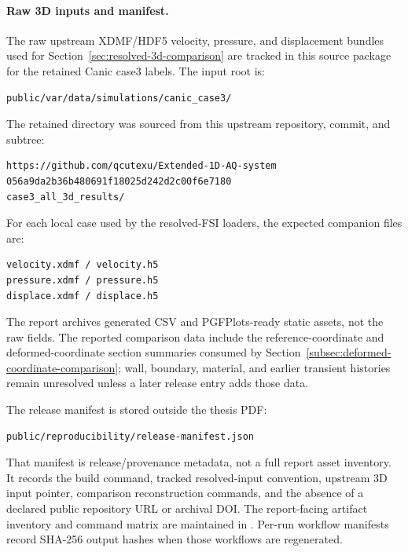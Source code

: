 \paragraph*{Raw 3D inputs and manifest.}
The raw upstream XDMF/HDF5 velocity, pressure, and displacement bundles used for
Section~\ref{sec:resolved-3d-comparison} are tracked in this source package for
the retained Canic case3 labels. The input root is:
\begin{lstlisting}[basicstyle=\ttfamily\footnotesize,breaklines=true]
public/var/data/simulations/canic_case3/
\end{lstlisting}
The retained directory was sourced from this upstream repository, commit, and
subtree:
\begin{lstlisting}[basicstyle=\ttfamily\footnotesize,breaklines=true]
https://github.com/qcutexu/Extended-1D-AQ-system
056a9da2b36b480691f18025d242d2c00f6e7180
case3_all_3d_results/
\end{lstlisting}
For each local case used by the resolved-FSI loaders, the expected companion
files are:
\begin{lstlisting}[basicstyle=\ttfamily\footnotesize,breaklines=true]
velocity.xdmf / velocity.h5
pressure.xdmf / pressure.h5
displace.xdmf / displace.h5
\end{lstlisting}
The report archives generated CSV and PGFPlots-ready static assets, not the raw
fields. The reported comparison data
include the reference-coordinate and deformed-coordinate section summaries
consumed by Section~\ref{subsec:deformed-coordinate-comparison}; wall,
boundary, material, and earlier transient histories remain unresolved unless a
later release entry adds those data.

The release manifest is stored outside the thesis PDF:
\begin{lstlisting}[basicstyle=\ttfamily\footnotesize,breaklines=true]
public/reproducibility/release-manifest.json
\end{lstlisting}
That manifest is release/provenance metadata, not a full report asset
inventory. It records the build command, tracked resolved-input convention,
upstream 3D input pointer, comparison reconstruction commands, and the absence
of a declared public repository URL or archival DOI. The report-facing artifact
inventory and command matrix are maintained in
.
Per-run workflow manifests record SHA-256 output hashes when those workflows are
regenerated.
